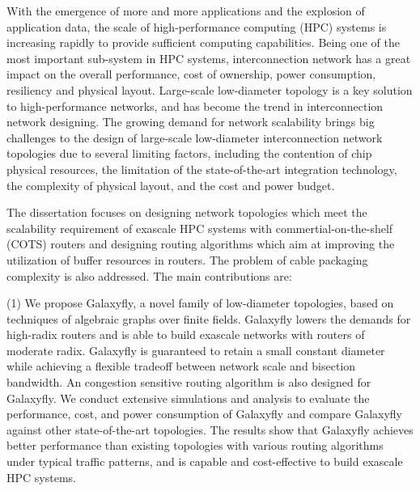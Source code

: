 \begin{eabstract}
  With the emergence of more and more applications
  and the explosion of application data,
  the scale of high-performance computing (HPC) systems is increasing rapidly
  to provide sufficient computing capabilities.
  Being one of the most important sub-system in HPC systems,
  interconnection network has a great impact on the overall performance,
  cost of ownership, power consumption, resiliency and physical layout.
  Large-scale low-diameter topology is a key solution to high-performance networks,
  and has become the trend in interconnection network designing.
  The growing demand for network scalability brings
  big challenges to the design of large-scale low-diameter
  interconnection network topologies due to several limiting factors,
  including the contention of chip physical resources,
  the limitation of the state-of-the-art integration technology,
  the complexity of physical layout, and the cost and power budget.
  
  The dissertation focuses on designing network topologies
  which meet the scalability requirement of exascale HPC systems
  with commertial-on-the-shelf (COTS) routers
  and designing routing algorithms which aim at improving
  the utilization of buffer resources in routers.
  The problem of cable packaging complexity is also addressed.
  The main contributions are:

  (1) 
  We propose Galaxyfly, a novel family of low-diameter topologies,
  based on techniques of algebraic graphs over finite fields.
  Galaxyfly lowers the demands for high-radix routers
  and is able to build exascale networks with routers of moderate radix. 
  Galaxyfly is guaranteed to retain a small constant diameter
  while achieving a flexible tradeoff between network scale
  and bisection bandwidth.
  An congestion sensitive routing algorithm is also designed for Galaxyfly.
  We conduct extensive simulations and
  analysis to evaluate the performance, cost,
  and power consumption of Galaxyfly and compare Galaxyfly
  against other state-of-the-art topologies.
  The results show that Galaxyfly achieves better performance
  than existing topologies with various routing algorithms under typical traffic patterns,
  and is capable and cost-effective to build exascale HPC systems.


\end{eabstract}
